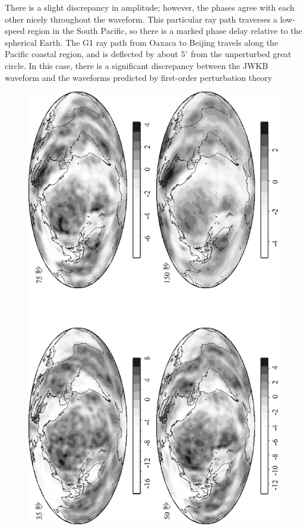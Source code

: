There is a slight discrepancy in amplitude;
however, the phases agree with each other
nicely throughout the waveform.
This particular ray path traverses a
low-speed region in the South Pacific,
so there is a marked phase delay
relative to the spherical Earth.
The G1 ray path from Oaxaca to Beijing
travels along the Pacific coastal region,
and is deflected by about $5^\circ$ from the unperturbed great circle. 
In this case, there is a significant discrepancy between the JWKB
waveform and the waveforms predicted by first-order perturbation theory
\begin{figure}[!t]
\begin{center}
\includegraphics[angle=180]{../figures/chap16/fig18.eps}

\end{center}
\end{figure}

